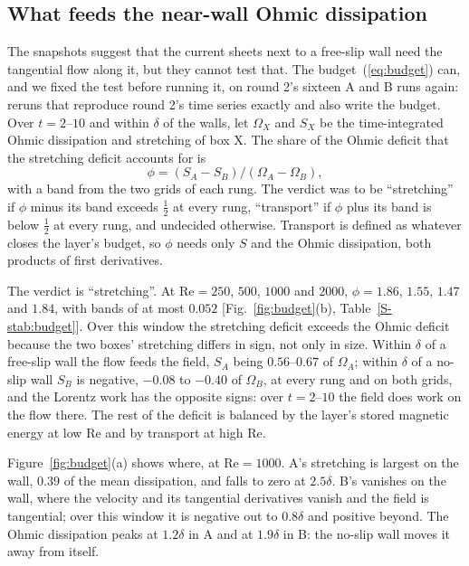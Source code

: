 \documentclass[aip,pop,reprint,amsmath,amssymb,superscriptaddress,floatfix]{revtex4-2}
\newcommand{\Rey}{\mathrm{Re}}
\begin{document}
\subsection{What feeds the near-wall Ohmic dissipation}
\label{sec:budget}

The snapshots suggest that the current sheets next to a free-slip wall need the
tangential flow along it, but they cannot test that. The budget~(\ref{eq:budget})
can, and we fixed the test before running it, on round 2's sixteen A and B runs
again: reruns that reproduce round 2's time series exactly and also write the budget.
Over $t=2$--$10$ and within $\delta$ of the walls, let $\Omega_X$ and $S_X$ be the
time-integrated Ohmic dissipation and stretching of box X. The share of the Ohmic
deficit that the stretching deficit accounts for is
\begin{equation}
  \phi = (S_A-S_B)\big/(\Omega_A-\Omega_B),
  \label{eq:phi}
\end{equation}
with a band from the two grids of each rung. The verdict was to be ``stretching'' if
$\phi$ minus its band exceeds $\frac12$ at every rung, ``transport'' if $\phi$ plus
its band is below $\frac12$ at every rung, and undecided otherwise. Transport is
defined as whatever closes the layer's budget, so $\phi$ needs only $S$ and the Ohmic
dissipation, both products of first derivatives.

The verdict is ``stretching''. At $\Rey=250$, $500$, $1000$ and $2000$, $\phi=1.86$,
$1.55$, $1.47$ and $1.84$, with bands of at most $0.052$ [Fig.~\ref{fig:budget}(b),
Table~\ref{S-stab:budget}]. Over this window the stretching deficit exceeds the Ohmic
deficit because the two boxes' stretching differs in sign, not only in size. Within
$\delta$ of a free-slip wall the flow feeds the field, $S_A$ being $0.56$--$0.67$ of
$\Omega_A$; within $\delta$ of a no-slip wall $S_B$ is negative, $-0.08$ to $-0.40$
of $\Omega_B$, at every rung and on both grids, and the Lorentz work has the opposite
signs: over $t=2$--$10$ the field does work on the flow there. The rest of the deficit
is balanced by the layer's stored magnetic energy at low $\Rey$ and by transport at
high $\Rey$.

Figure~\ref{fig:budget}(a) shows where, at $\Rey=1000$. A's stretching is largest on
the wall, $0.39$ of the mean dissipation, and falls to zero at $2.5\delta$. B's
vanishes on the wall, where the velocity and its tangential derivatives vanish and the
field is tangential; over this window it is negative out to $0.8\delta$ and positive
beyond. The Ohmic dissipation peaks at $1.2\delta$ in A and at $1.9\delta$ in B: the
no-slip wall moves it away from itself.
\end{document}
